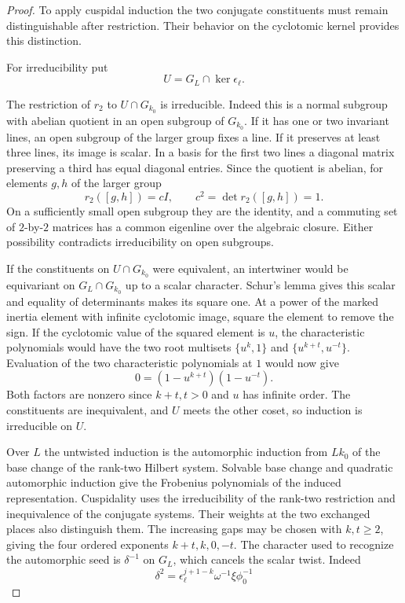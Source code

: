 \begin{proof}

To apply cuspidal induction the two conjugate constituents must remain distinguishable after restriction. Their behavior on the cyclotomic kernel provides this distinction.


For irreducibility put
\[
 U=G_L\cap\ker\epsilon_\ell.
\]

The restriction of \(r_2\) to \(U\cap G_{k_0}\) is
irreducible. Indeed this is a normal subgroup with
abelian quotient in an open subgroup of \(G_{k_0}\).
If it has one or two invariant lines, an open subgroup
of the larger group fixes a line. If it preserves at least three lines, its image is scalar. In a basis for the first two lines a diagonal matrix preserving a third has equal diagonal entries. Since the quotient is abelian, for elements \(g,h\) of the larger group
\[
 r_2([g,h])=cI,\qquad c^2=\det r_2([g,h])=1 .
\] On a
sufficiently small open subgroup they are the identity,
and a commuting set of \(2\)-by-\(2\) matrices has a
common eigenline over the algebraic closure. Either
possibility contradicts irreducibility on open subgroups.

If the constituents on \(U\cap G_{k_0}\) were equivalent,
an intertwiner would be equivariant on \(G_L\cap G_{k_0}\)
up to a scalar character. Schur's lemma gives this scalar and
equality of determinants makes its square one. At a power of the marked inertia element
with infinite cyclotomic image, square the element to
remove the sign. If the cyclotomic value of the squared
element is \(u\), the characteristic polynomials would
have the two root multisets
\(\{u^k,1\}\) and \(\{u^{k+t},u^{-t}\}\).
Evaluation of the two characteristic polynomials at \(1\) would now give
\[
 0=(1-u^{k+t})(1-u^{-t}).
\]
Both factors are nonzero since \(k+t,t>0\) and \(u\) has infinite order. The constituents are inequivalent, and \(U\) meets
the other coset, so induction is irreducible on \(U\).


Over \(L\) the untwisted induction is the automorphic
induction from \(Lk_0\) of the base change of the
rank-two Hilbert system. Solvable base change and
quadratic automorphic induction give the Frobenius
polynomials of the induced representation. Cuspidality
uses the irreducibility of the rank-two restriction
and inequivalence of the conjugate systems. Their weights at the two exchanged places also distinguish them.
The increasing gaps may be chosen with \(k,t\geq2\),
giving the four ordered exponents \(k+t,k,0,-t\).
The character used to recognize the automorphic seed
is \(\delta^{-1}\) on \(G_L\), which cancels the scalar
twist. Indeed
\[
 \delta^2=\epsilon_\ell^{j+1-k}\omega^{-1}\xi\phi_0^{-1}
\]


\end{proof}
